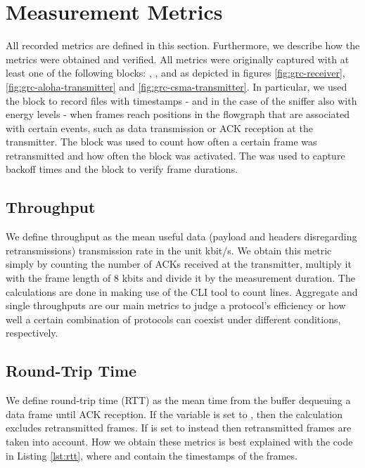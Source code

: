 \clearpage

\section{Measurement Metrics}
\label{sec:measurement-metrics}

All recorded metrics are defined in this section. Furthermore, we describe how the metrics were obtained and verified. All metrics were originally captured with at least one of the following blocks: , ,  and  as depicted in figures \ref{fig:grc-receiver}, \ref{fig:grc-aloha-transmitter} and \ref{fig:grc-csma-transmitter}. In particular, we used the  block to record files with timestamps - and in the case of the sniffer also with energy levels - when frames reach positions in the flowgraph that are associated with certain events, such as data transmission or ACK reception at the transmitter. The  block was used to count how often a certain frame was retransmitted and how often the  block was activated. The  was used to capture backoff times and the  block to verify frame durations.

\subsection{Throughput}

We define throughput as the mean useful data (payload and headers disregarding retransmissions) transmission rate in the unit kbit/s. We obtain this metric simply by counting the number of ACKs received at the transmitter, multiply it with the frame length of 8 kbits and divide it by the measurement duration. The calculations are done in  making use of the CLI tool  to count lines. Aggregate and single throughputs are our main metrics to judge a protocol's efficiency or how well a certain combination of protocols can coexist under different conditions, respectively.

\subsection{Round-Trip Time}
\label{sec:rtt}

We define round-trip time (RTT) as the mean time from the buffer dequeuing a data frame until ACK reception. If the variable  is set to , then the calculation excludes retransmitted frames. If  is set to  instead then retransmitted frames are taken into account. How we obtain these metrics is best explained with the code in Listing \ref{lst:rtt}, where  and  contain the timestamps of the frames. 

